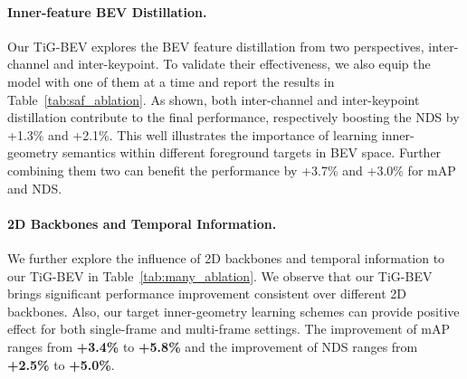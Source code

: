 \paragraph{Inner-feature BEV Distillation.}
Our TiG-BEV explores the BEV feature distillation from two perspectives, inter-channel and inter-keypoint. To validate their effectiveness, we also equip the model with one of them at a time and report the results in Table~\ref{tab:saf_ablation}. As shown, both inter-channel and inter-keypoint distillation contribute to the final performance, respectively boosting the NDS by +1.3\% and +2.1\%. This well illustrates the importance of learning inner-geometry semantics within different foreground targets in BEV space. Further combining them two can benefit the performance by +3.7\% and +3.0\% for mAP and NDS.

\paragraph{2D Backbones and Temporal Information.}
We further explore the influence of 2D backbones and temporal information to our TiG-BEV in Table~\ref{tab:many_ablation}. We observe that our TiG-BEV brings significant performance improvement consistent over different 2D backbones. Also, our target inner-geometry learning schemes can provide positive effect for both single-frame and multi-frame settings. The improvement of mAP ranges from \textbf{+3.4\%} to \textbf{+5.8\%} and the improvement of NDS ranges from \textbf{+2.5\%} to \textbf{+5.0\%}.





